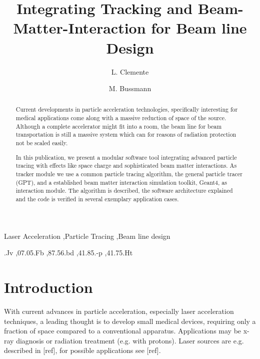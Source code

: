 \documentclass[3p, twocolumn, number, a4paper, 10pt, oneside, preprint]{elsarticle}
\begin{document}
\begin{frontmatter}

\title{Integrating Tracking and  Beam-Matter-Interaction for Beam line Design}

\author[fzd]{L. Clemente}
\author[fzd]{M. Bussmann}

\address[fzd]{Forschungszentrum Dresden-Rossendorf, Dresden, Germany}

\begin{abstract}
	Current developments in particle acceleration technologies, specifically interesting for medical applications come along with a massive reduction of space of the source. Although a complete accelerator might fit into a room, the beam line for beam transportation is still a massive system which can for reasons of radiation protection not be scaled easily.
	
	In this publication, we present a modular software tool integrating advanced particle tracing with effects like space charge and sophisticated beam matter interactions. As tracker module we use a common particle tracing algorithm, the general particle tracer (GPT), and a established beam matter interaction simulation toolkit, Geant4, as interaction module. The algorithm is described, the software architecture explained and the code is verified in several exemplary application cases.
\end{abstract}

\begin{keyword}
	Laser Acceleration \sep Particle Tracing \sep Beam line design
	
	.Jv %
	\sep 07.05.Fb %
	\sep 87.56.bd %
	\sep 41.85.-p %
	\sep 41.75.Ht %
\end{keyword}

\end{frontmatter}



\section{Introduction}
\label{introduction}

With current advances in particle acceleration, especially laser acceleration techniques, a leading thought is to develop small medical devices, requiring only a fraction of space compared to a conventional apparatus. Applications may be x-ray diagnosis or radiation treatment (e.g. with protons). Laser sources are e.g. described in [ref], for possible applications see [ref].
\end{document}
